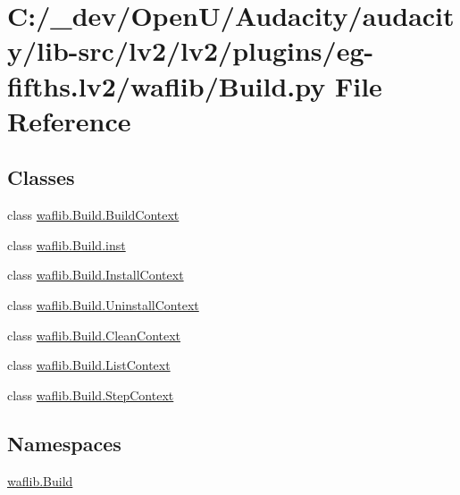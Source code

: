 \hypertarget{lv2_2plugins_2eg-fifths_8lv2_2waflib_2_build_8py}{}\section{C\+:/\+\_\+dev/\+Open\+U/\+Audacity/audacity/lib-\/src/lv2/lv2/plugins/eg-\/fifths.lv2/waflib/\+Build.py File Reference}
\label{lv2_2plugins_2eg-fifths_8lv2_2waflib_2_build_8py}
\subsection*{Classes}
\begin{DoxyCompactItemize}
\item 
class \hyperlink{classwaflib_1_1_build_1_1_build_context}{waflib.\+Build.\+Build\+Context}
\item 
class \hyperlink{classwaflib_1_1_build_1_1inst}{waflib.\+Build.\+inst}
\item 
class \hyperlink{classwaflib_1_1_build_1_1_install_context}{waflib.\+Build.\+Install\+Context}
\item 
class \hyperlink{classwaflib_1_1_build_1_1_uninstall_context}{waflib.\+Build.\+Uninstall\+Context}
\item 
class \hyperlink{classwaflib_1_1_build_1_1_clean_context}{waflib.\+Build.\+Clean\+Context}
\item 
class \hyperlink{classwaflib_1_1_build_1_1_list_context}{waflib.\+Build.\+List\+Context}
\item 
class \hyperlink{classwaflib_1_1_build_1_1_step_context}{waflib.\+Build.\+Step\+Context}
\end{DoxyCompactItemize}
\subsection*{Namespaces}
\begin{DoxyCompactItemize}
\item 
 \hyperlink{namespacewaflib_1_1_build}{waflib.\+Build}
\end{DoxyCompactItemize}
